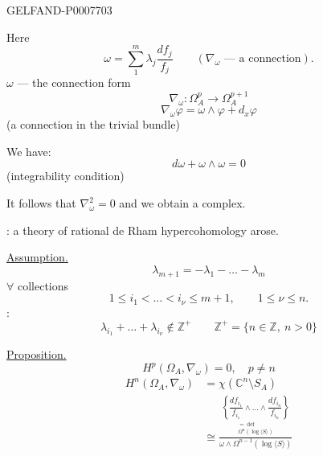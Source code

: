 \begin{GelfandAdjacentEvidence}{GELFAND-P000770}{3}


Here
\[
\omega=\sum_{1}^{m}\lambda_j\frac{df_j}{f_j}
\qquad(\nabla_\omega\text{ --- a connection}).
\]
\(\omega\) --- the connection form
\[
\nabla_\omega:\Omega_A^p\longrightarrow\Omega_A^{p+1}
\]
\[
\nabla_\omega\varphi=\omega\wedge\varphi+d_x\varphi
\]
(a connection in the trivial bundle)

We have:
\[
d\omega+\omega\wedge\omega=0
\]
(integrability condition)

It follows that \(\nabla_\omega^2=0\) and we obtain a complex.

: a theory of rational de Rham hypercohomology arose.

\underline{Assumption.}
\[
\lambda_{m+1}=-\lambda_1-\ldots-\lambda_m
\]
\(\forall\) collections
\[
1\le i_1<\ldots<i_\nu\le m+1,\qquad1\le\nu\le n.
\]
:
\[
\lambda_{i_1}+\ldots+\lambda_{i_\nu}\notin\mathbb Z^+
\qquad
\mathbb Z^+=\{n\in\mathbb Z,\ n>0\}
\]

\underline{Proposition.}
\[
H^p(\Omega_A,\nabla_\omega)=0,\quad p\ne n
\]
\[
\begin{aligned}
H^n(\Omega_A,\nabla_\omega)
&=\chi(\mathbb C^n\setminus S_A)\\
&\cong\frac{
\underset{\substack{=\ \mathrm{def}\\\Omega^n(\log\langle S\rangle)}}{
\left\{\dfrac{df_{i_1}}{f_{i_1}}\wedge\ldots\wedge\dfrac{df_{i_n}}{f_{i_n}}\right\}}
}{\omega\wedge\Omega^{n-1}(\log\langle S\rangle)}
\end{aligned}
\]
\end{GelfandAdjacentEvidence}



